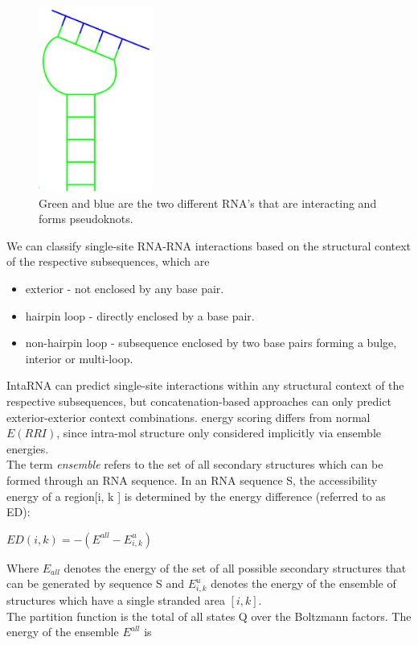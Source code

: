 \documentclass[twoside,a4paper]{report}
\begin{document}
	\begin{figure}[H]
		\includegraphics[width=0.2\linewidth]{acess}
		\centering
		\caption{ Green and blue are the two different RNA's that are interacting and forms pseudoknots. } 
		\label{fig:acess}
	\end{figure}

	We can classify single-site RNA-RNA interactions based on the structural context of the respective subsequences, which are\\
	
	\begin{itemize}
	\item exterior - not enclosed by any base pair.
	\item hairpin loop - directly enclosed by a base pair.
	\item non-hairpin loop - subsequence enclosed by two base pairs forming a bulge, interior or multi-loop.\\
    \end{itemize}
		
	IntaRNA can predict single-site interactions within any structural context of the respective subsequences, but concatenation-based approaches can only predict exterior-exterior context combinations. energy scoring differs from normal $E(RRI)$, since intra-mol structure only considered implicitly via ensemble energies.\\
	
	The term \textit{ensemble} refers to the set of all secondary structures which can be formed through an RNA sequence. In an RNA sequence S, the accessibility energy of a region[i, k ] is determined by the energy difference (referred to as ED):
	
	\begin{center}
		$ ED(i,k) = - (E^{all} - E_{i,k}^{u} )$\\
	\end{center}
	
	Where $E_{all}$ denotes the energy of the set of all possible secondary structures that can be generated by sequence S and $E_{i,k}^{u}$ denotes the energy of the ensemble of structures which have a single stranded area $ [i,k]$. \\
	The partition function is the total of all states Q over the Boltzmann factors. The energy of the ensemble $E^{all}$ is 
	
\end{document}
